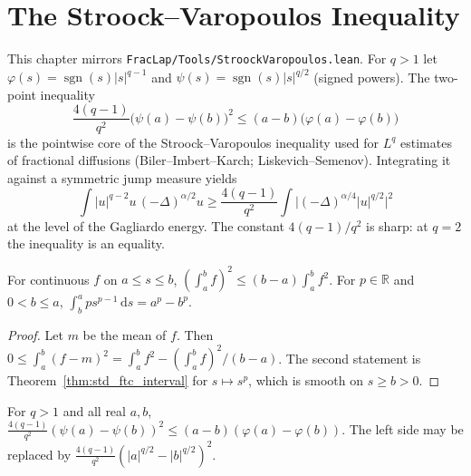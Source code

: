 \chapter{The Stroock--Varopoulos Inequality}

This chapter mirrors \texttt{FracLap/Tools/StroockVaropoulos.lean}. For $q > 1$ let $\varphi(s) = \operatorname{sgn}(s) \lvert s \rvert^{q-1}$ and $\psi(s) = \operatorname{sgn}(s) \lvert s \rvert^{q/2}$ (signed powers). The two-point inequality
\[
  \frac{4(q-1)}{q^2} \bigl(\psi(a) - \psi(b)\bigr)^2 \le (a - b)\bigl(\varphi(a) - \varphi(b)\bigr)
\]
is the pointwise core of the Stroock--Varopoulos inequality used for $L^q$ estimates of fractional diffusions (Biler--Imbert--Karch; Liskevich--Semenov). Integrating it against a symmetric jump measure yields
\[
  \int \lvert u \rvert^{q-2} u\, (-\Delta)^{\alpha/2} u \ge \frac{4(q-1)}{q^2} \int \bigl\lvert (-\Delta)^{\alpha/4} \lvert u \rvert^{q/2} \bigr\rvert^2
\]
at the level of the Gagliardo energy. The constant $4(q-1)/q^2$ is sharp: at $q = 2$ the inequality is an equality.

\begin{lemma}\label{lem:cauchy_schwarz_interval}
\leanok
For continuous $f$ on $a \le s \le b$, $(\int_a^b f)^2 \le (b - a) \int_a^b f^2$. For $p \in \mathbb{R}$ and $0 < b \le a$, $\int_b^a p s^{p-1}\, \mathrm{d}s = a^p - b^p$.
\end{lemma}

\begin{proof}
\leanok
Let $m$ be the mean of $f$. Then $0 \le \int_a^b (f - m)^2 = \int_a^b f^2 - (\int_a^b f)^2 / (b - a)$. The second statement is Theorem~\ref{thm:std_ftc_interval} for $s \mapsto s^p$, which is smooth on $s \ge b > 0$.
\end{proof}

\begin{theorem}\label{thm:sv_two_point}
\leanok
For $q > 1$ and all real $a, b$, $\frac{4(q-1)}{q^2} (\psi(a) - \psi(b))^2 \le (a - b)(\varphi(a) - \varphi(b))$. The left side may be replaced by $\frac{4(q-1)}{q^2} (\lvert a \rvert^{q/2} - \lvert b \rvert^{q/2})^2$.
\end{theorem}

